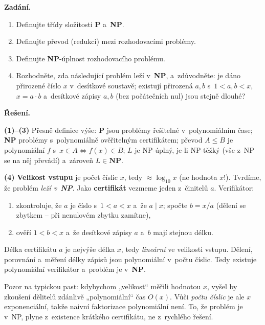 \documentclass[11pt,a4paper]{article}
\begin{document}
\begin{priklad}
\par
\textbf{Zadání.}\par
\begin{enumerate}
  \item Definujte třídy složitosti \textbf{P} a~\textbf{NP}.
  \item Definujte převod (redukci) mezi rozhodovacími problémy.
  \item Definujte \textbf{NP}-úplnost rozhodovacího problému.
  \item Rozhodněte, zda následující problém leží v~\textbf{NP}, a~zdůvodněte: je dáno přirozené číslo $x$ v~desítkové soustavě; existují přirozená $a,b$ s~$1<a,b<x$, $x=a\cdot b$ a~desítkové zápisy $a,b$ (bez počátečních nul) jsou stejně dlouhé?
\end{enumerate}

\smallskip
\textbf{Řešení.}\par
\textbf{(1)--(3)} Přesně definice výše: \textbf{P} jsou problémy řešitelné v~polynomiálním čase; \textbf{NP} problémy s~polynomiálně ověřitelným certifikátem; převod $A\le B$ je polynomiální $f$ s~$x\in A\Leftrightarrow f(x)\in B$; $L$ je NP-úplný, je-li NP-těžký (vše z~NP se na něj převádí) a~zároveň $L\in\textbf{NP}$.

\textbf{(4)} \textbf{Velikost vstupu} je počet číslic $x$, tedy $\approx\log_{10}x$ (ne hodnota $x$!). Tvrdíme, že problém \emph{leží v~\textbf{NP}}. Jako \textbf{certifikát} vezmeme jeden z~činitelů $a$. Verifikátor:
\begin{enumerate}
  \item zkontroluje, že $a$ je číslo s~$1<a<x$ a~že $a\mid x$; spočte $b=x/a$ (dělení se zbytkem -- při nenulovém zbytku zamítne),
  \item ověří $1<b<x$ a~že desítkové zápisy $a$ a~$b$ mají stejnou délku.
\end{enumerate}
Délka certifikátu $a$ je nejvýše délka $x$, tedy \emph{lineární} ve velikosti vstupu. Dělení, porovnání a~měření délky zápisů jsou polynomiální v~počtu číslic. Tedy existuje polynomiální verifikátor a~problém je v~\textbf{NP}.

\begin{poznamka}
Pozor na typickou past: kdybychom „velikost`` měřili hodnotou $x$, vyšel by zkoušení dělitelů zdánlivě „polynomiální`` čas $O(x)$. Vůči \emph{počtu číslic} je ale $x$ exponenciální, takže naivní faktorizace polynomiální není. To, že problém je v~NP, plyne z~existence krátkého certifikátu, ne z~rychlého řešení.
\end{poznamka}
\end{priklad}
\end{document}
